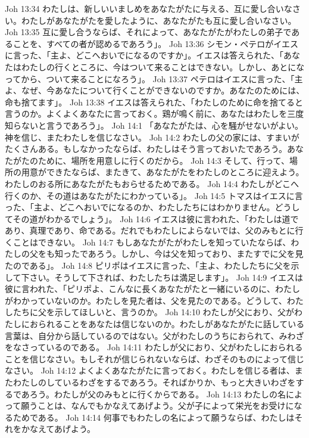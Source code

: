 Joh 13:34  わたしは、新しいいましめをあなたがたに与える、互に愛し合いなさい。わたしがあなたがたを愛したように、あなたがたも互に愛し合いなさい。
Joh 13:35  互に愛し合うならば、それによって、あなたがたがわたしの弟子であることを、すべての者が認めるであろう」。
Joh 13:36  シモン・ペテロがイエスに言った、「主よ、どこへおいでになるのですか」。イエスは答えられた、「あなたはわたしの行くところに、今はついて来ることはできない。しかし、あとになってから、ついて来ることになろう」。
Joh 13:37  ペテロはイエスに言った、「主よ、なぜ、今あなたについて行くことができないのですか。あなたのためには、命も捨てます」。
Joh 13:38  イエスは答えられた、「わたしのために命を捨てると言うのか。よくよくあなたに言っておく。鶏が鳴く前に、あなたはわたしを三度知らないと言うであろう」。
Joh 14:1  「あなたがたは、心を騒がせないがよい。神を信じ、またわたしを信じなさい。
Joh 14:2  わたしの父の家には、すまいがたくさんある。もしなかったならば、わたしはそう言っておいたであろう。あなたがたのために、場所を用意しに行くのだから。
Joh 14:3  そして、行って、場所の用意ができたならば、またきて、あなたがたをわたしのところに迎えよう。わたしのおる所にあなたがたもおらせるためである。
Joh 14:4  わたしがどこへ行くのか、その道はあなたがたにわかっている」。
Joh 14:5  トマスはイエスに言った、「主よ、どこへおいでになるのか、わたしたちにはわかりません。どうしてその道がわかるでしょう」。
Joh 14:6  イエスは彼に言われた、「わたしは道であり、真理であり、命である。だれでもわたしによらないでは、父のみもとに行くことはできない。
Joh 14:7  もしあなたがたがわたしを知っていたならば、わたしの父をも知ったであろう。しかし、今は父を知っており、またすでに父を見たのである」。
Joh 14:8  ピリポはイエスに言った、「主よ、わたしたちに父を示して下さい。そうして下されば、わたしたちは満足します」。
Joh 14:9  イエスは彼に言われた、「ピリポよ、こんなに長くあなたがたと一緒にいるのに、わたしがわかっていないのか。わたしを見た者は、父を見たのである。どうして、わたしたちに父を示してほしいと、言うのか。
Joh 14:10  わたしが父におり、父がわたしにおられることをあなたは信じないのか。わたしがあなたがたに話している言葉は、自分から話しているのではない。父がわたしのうちにおられて、みわざをなさっているのである。
Joh 14:11  わたしが父におり、父がわたしにおられることを信じなさい。もしそれが信じられないならば、わざそのものによって信じなさい。
Joh 14:12  よくよくあなたがたに言っておく。わたしを信じる者は、またわたしのしているわざをするであろう。そればかりか、もっと大きいわざをするであろう。わたしが父のみもとに行くからである。
Joh 14:13  わたしの名によって願うことは、なんでもかなえてあげよう。父が子によって栄光をお受けになるためである。
Joh 14:14  何事でもわたしの名によって願うならば、わたしはそれをかなえてあげよう。
